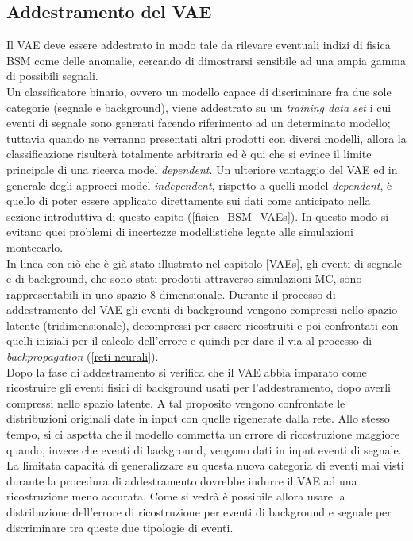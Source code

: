 \subsection{Addestramento del VAE}
\label{simulazione}
Il VAE deve essere addestrato in modo tale da rilevare eventuali indizi di fisica BSM come delle anomalie, cercando di dimostrarsi sensibile ad una ampia gamma di possibili segnali.\\
Un classificatore binario, ovvero un modello capace di discriminare fra due sole categorie (segnale e background), viene addestrato su un \textit{training data set} i cui eventi di segnale sono generati facendo riferimento ad un determinato modello; tuttavia quando ne verranno presentati altri prodotti con diversi modelli, allora la classificazione risulterà totalmente arbitraria ed è qui che si evince il limite principale di una ricerca model \textit{dependent}. Un ulteriore vantaggio del VAE ed in generale degli approcci model \textit{independent}, rispetto a quelli model \textit{dependent}, è quello di poter essere applicato direttamente sui dati come anticipato nella sezione introduttiva di questo capito (\ref{fisica_BSM_VAEs}). In questo modo si evitano quei problemi di incertezze modellistiche legate alle simulazioni montecarlo.\\
In linea con ciò che è già stato illustrato nel capitolo \ref{VAEs}, gli eventi di segnale e di background, che sono stati prodotti attraverso simulazioni MC, sono rappresentabili in uno spazio 8-dimensionale. Durante il processo di addestramento del VAE gli eventi di background vengono compressi nello spazio latente (tridimensionale), decompressi per essere ricostruiti e poi confrontati con quelli iniziali per il calcolo dell'errore e quindi per dare il via al processo di \textit{backpropagation} (\ref{reti neurali}). \\
Dopo la fase di addestramento si verifica che il VAE abbia imparato come ricostruire gli eventi fisici di background usati per l'addestramento, dopo averli compressi nello spazio latente. A tal proposito vengono confrontate le distribuzioni originali date in input con quelle rigenerate dalla rete. Allo stesso tempo, si ci aspetta che il modello  commetta un errore di ricostruzione maggiore quando, invece che eventi di background, vengono dati in input eventi di segnale. La limitata capacità di generalizzare su questa nuova categoria di eventi mai visti durante la procedura di addestramento dovrebbe indurre il VAE ad una ricostruzione meno accurata. Come si vedrà è possibile allora usare la distribuzione dell'errore di ricostruzione per eventi di background e segnale per discriminare tra queste due tipologie di eventi.\\
